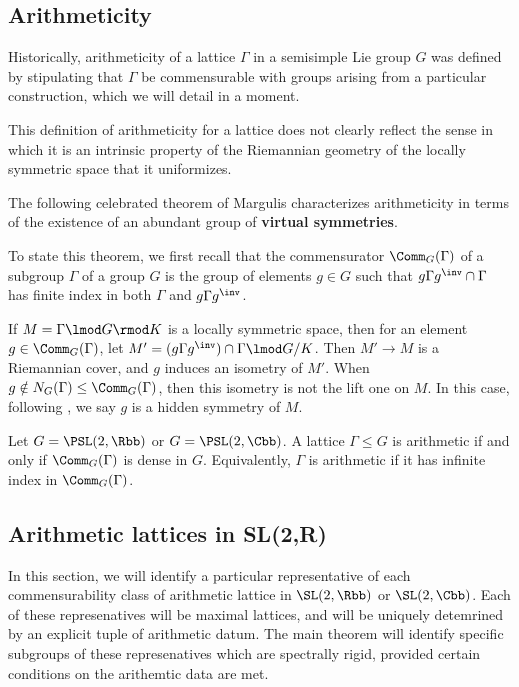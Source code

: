 \subsection{Arithmeticity}
Historically, arithmeticity of a lattice $\Gamma$ in a semisimple Lie group $G$ was defined by stipulating that $\Gamma$ be commensurable with groups arising from a particular construction, which we will detail in a moment.

This definition of arithmeticity for a lattice does not clearly reflect the sense in which it is an intrinsic property of the Riemannian geometry of the locally symmetric space that it uniformizes.

The following celebrated theorem of Margulis characterizes arithmeticity in terms of the existence of an abundant group of \textbf{virtual symmetries}.

To state this theorem, we first recall that the commensurator $\Comm_G(\Gamma)$ of a subgroup $\Gamma$ of a group $G$ is the group of elements $g\in G$ such that $g\Gamma g^\inv \cap \Gamma$ has finite index in both $\Gamma$ and $g\Gamma g^\inv $.

\begin{rem}\label{remark:hiddensymm}
    If $M=\Gamma \lmod G \rmod K$ is a locally symmetric space, then for an element $g \in \Comm_G(\Gamma)$, let $M' = (g\Gamma g^\inv) \cap \Gamma \lmod G / K$.  Then $M' \to M$ is a Riemannian cover, and $g$ induces an isometry of $M'$. When $g \notin N_G(\Gamma) \leq \Comm_G(\Gamma)$, then this isometry is not the lift one on $M$. In this case, following \cite{farbHiddenSymmetryArithmetic2004}, we say $g$ is a hidden symmetry of $M$.
\end{rem}

\begin{thm}%
    Let $G =\PSL(2,\Rbb)$ or $G= \PSL(2,\Cbb)$. A lattice $\Gamma\leq G$ is arithmetic if and only if $\Comm_G(\Gamma)$ is dense in $G$. Equivalently, $\Gamma$ is arithmetic if it has infinite index in $\Comm_G(\Gamma)$.
\end{thm}
\subsection{Arithmetic lattices in SL(2,R)}
In this section, we will identify a particular representative of each commensurability class of arithmetic lattice in $\SL(2,\Rbb)$ or $\SL(2,\Cbb)$. Each of these represenatives will be maximal lattices, and will be uniquely detemrined by an explicit tuple of arithmetic datum. The main theorem will identify specific subgroups of these represenatives which are spectrally rigid, provided certain conditions on the arithemtic data are met.